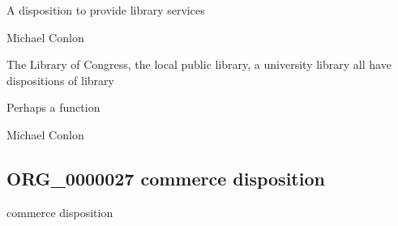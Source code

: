 \documentclass[letterpaper,10pt,english]{sphinxmanual}
\begin{document}
\begin{sphinxShadowBox}

\sphinxAtStartPar
{\hyperref[\detokenize{doc-BFO_0000016::doc}]{}}
\end{sphinxShadowBox}

\begin{sphinxShadowBox}

\sphinxAtStartPar
A disposition to provide library services
\end{sphinxShadowBox}

\begin{sphinxShadowBox}

\sphinxAtStartPar
Michael Conlon 
\end{sphinxShadowBox}

\begin{sphinxShadowBox}

\sphinxAtStartPar
The Library of Congress, the local public library, a university library all have dispositions of library
\end{sphinxShadowBox}

\begin{sphinxShadowBox}

\sphinxAtStartPar
Perhaps a function
\end{sphinxShadowBox}

\begin{sphinxShadowBox}

\sphinxAtStartPar
Michael Conlon 
\end{sphinxShadowBox}
\begin{quote}

\ignorespaces \end{quote}


\subsection{ORG\_0000027 \sphinxhyphen{} commerce disposition}
\label{\detokenize{doc-ORG_0000027:org-0000027-commerce-disposition}}\label{\detokenize{doc-ORG_0000027:index-0}}\label{\detokenize{doc-ORG_0000027::doc}}
\begin{sphinxShadowBox}

\sphinxAtStartPar
commerce disposition
\end{sphinxShadowBox}
\end{document}
